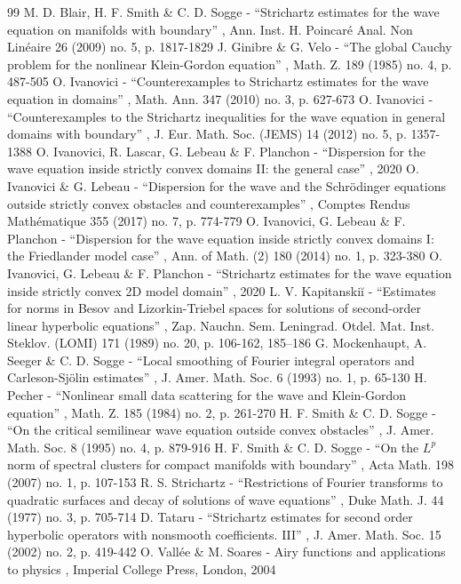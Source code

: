 \documentclass[11pt]{article}
\theoremstyle{plain}
\theoremstyle{definition}
\begin{document}
\begin{thebibliography}{99}
 M. D. Blair, H. F. Smith \& C. D. Sogge - “Strichartz estimates for the wave equation on manifolds with boundary” , Ann. Inst. H. Poincaré Anal. Non Linéaire 26 (2009) no. 5, p. 1817-1829
 J. Ginibre \& G. Velo - “The global Cauchy problem for the nonlinear Klein-Gordon equation” , Math. Z. 189 (1985) no. 4, p. 487-505
 O. Ivanovici - “Counterexamples to Strichartz estimates for the wave equation in domains” , Math. Ann. 347 (2010) no. 3, p. 627-673
 O. Ivanovici - “Counterexamples to the Strichartz inequalities for the wave equation in general domains with boundary” , J. Eur. Math. Soc. (JEMS) 14 (2012) no. 5, p. 1357-1388
 O. Ivanovici, R. Lascar, G. Lebeau \& F. Planchon - “Dispersion for the wave equation inside strictly convex domains II: the general case” , 2020
 O. Ivanovici \& G. Lebeau - “Dispersion for the wave and the Schrödinger equations outside strictly convex obstacles and counterexamples” , Comptes Rendus Mathématique 355 (2017) no. 7, p. 774-779
 O. Ivanovici, G. Lebeau \& F. Planchon - “Dispersion for the wave equation inside strictly convex domains I: the Friedlander model case” , Ann. of Math. (2) 180 (2014) no. 1, p. 323-380
 O. Ivanovici, G. Lebeau \& F. Planchon - “Strichartz estimates for the wave equation inside strictly convex 2D model domain” , 2020
 L. V. Kapitanskiĭ - “Estimates for norms in Besov and Lizorkin-Triebel spaces for solutions of second-order linear hyperbolic equations” , Zap. Nauchn. Sem. Leningrad. Otdel. Mat. Inst. Steklov. (LOMI) 171 (1989) no. 20, p. 106-162, 185–186
 G. Mockenhaupt, A. Seeger \& C. D. Sogge - “Local smoothing of Fourier integral operators and Carleson-Sjölin estimates” , J. Amer. Math. Soc. 6 (1993) no. 1, p. 65-130
 H. Pecher - “Nonlinear small data scattering for the wave and Klein-Gordon equation” , Math. Z. 185 (1984) no. 2, p. 261-270
 H. F. Smith \& C. D. Sogge - “On the critical semilinear wave equation outside convex obstacles” , J. Amer. Math. Soc. 8 (1995) no. 4, p. 879-916
 H. F. Smith \& C. D. Sogge - “On the $L^p$ norm of spectral clusters for compact manifolds with boundary” , Acta Math. 198 (2007) no. 1, p. 107-153
 R. S. Strichartz - “Restrictions of Fourier transforms to quadratic surfaces and decay of solutions of wave equations” , Duke Math. J. 44 (1977) no. 3, p. 705-714
 D. Tataru - “Strichartz estimates for second order hyperbolic operators with nonsmooth coefficients. III” , J. Amer. Math. Soc. 15 (2002) no. 2, p. 419-442
 O. Vallée \& M. Soares - Airy functions and applications to physics , Imperial College Press, London, 2004
\end{thebibliography}
\end{document}
